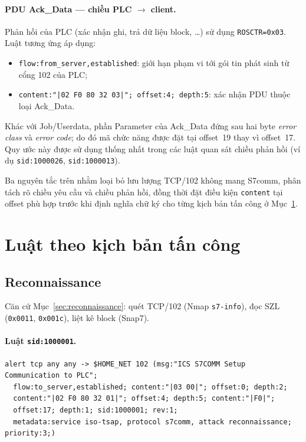 \documentclass[../main.tex]{subfiles}
\begin{document}
\paragraph{PDU Ack\_Data --- chiều PLC $\rightarrow$ client.}
Phản hồi của PLC (xác nhận ghi, trả dữ liệu block, \ldots) sử dụng \texttt{ROSCTR=0x03}. Luật tương ứng áp dụng:
\begin{itemize}
    \item \texttt{flow:from\_server,established}: giới hạn phạm vi tới gói tin phát sinh từ cổng 102 của PLC;
    \item \texttt{content:"|02 F0 80 32 03|"; offset:4; depth:5}: xác nhận PDU thuộc loại Ack\_Data.
\end{itemize}
Khác với Job/Userdata, phần Parameter của Ack\_Data đứng sau hai byte \emph{error class} và \emph{error code}; do đó mã chức năng được đặt tại offset~19 thay vì offset~17. Quy ước này được sử dụng thống nhất trong các luật quan sát chiều phản hồi (ví dụ \texttt{sid:1000026}, \texttt{sid:1000013}).

Ba nguyên tắc trên nhằm loại bỏ lưu lượng TCP/102 không mang S7comm, phân tách rõ chiều yêu cầu và chiều phản hồi, đồng thời đặt điều kiện \texttt{content} tại offset phù hợp trước khi định nghĩa chữ ký cho từng kịch bản tấn công ở Mục~\ref{sec:rules-by-scenario}.

\section{Luật theo kịch bản tấn công}
\label{sec:rules-by-scenario}

\subsection{Reconnaissance}
\label{sec:rules-recon}

Căn cứ Mục~\ref{sec:reconnaissance}: quét TCP/102 (Nmap \texttt{s7-info}), đọc SZL (\texttt{0x0011}, \texttt{0x001c}), liệt kê block (Snap7).

\paragraph{Luật \texttt{sid:1000001}.}
\begin{footnotesize}
\begin{verbatim}
alert tcp any any -> $HOME_NET 102 (msg:"ICS S7COMM Setup Communication to PLC";
  flow:to_server,established; content:"|03 00|"; offset:0; depth:2;
  content:"|02 F0 80 32 01|"; offset:4; depth:5; content:"|F0|";
  offset:17; depth:1; sid:1000001; rev:1;
  metadata:service iso-tsap, protocol s7comm, attack reconnaissance; priority:3;)
\end{verbatim}
\end{footnotesize}
\end{document}
